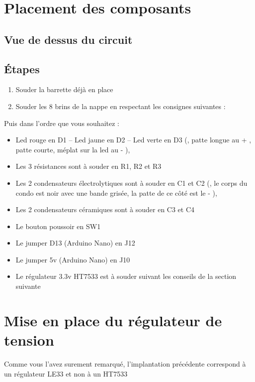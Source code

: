 \section{Placement des composants}

\subsection{Vue de dessus du circuit}
\subsection{Étapes}
\begin{enumerate}
\item Souder la barrette déjà en place
\item Souder les 8 brins de la nappe en respectant les consignes suivantes :
\end{enumerate}

Puis dans l'ordre que vous souhaitez : 
\begin{itemize}
    \item Led rouge en D1 – Led jaune en D2 – Led verte en D3 ({\color{red}{sont polarisées}}, patte longue au + ,  patte courte, méplat sur la led au - ),
    \item Les 3 résistances sont à souder en R1, R2 et R3
    \item Les 2 condensateurs électrolytiques sont à souder en C1 et C2 ({\color{red}{sont polarisées}}, le corps du condo est noir avec une bande grisée, la patte de ce côté est le - ),
    \item Les 2 condensateurs céramiques sont à souder en C3 et C4
    \item Le bouton poussoir en SW1
    \item Le jumper D13 (Arduino Nano) en J12
    \item Le jumper 5v (Arduino Nano) en J10
    \item Le régulateur 3.3v HT7533 est à souder suivant les conseils de la section suivante
\end{itemize}

\section{Mise en place du régulateur de tension}

Comme vous l'avez surement remarqué, l'implantation précédente correspond à un régulateur LE33 et non à un HT7533

